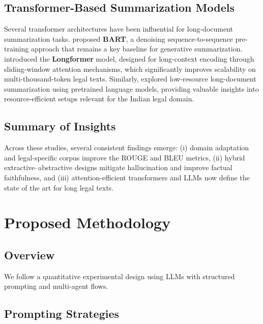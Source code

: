 \documentclass[sigconf]{acmart}
\begin{document}
\subsection{Transformer-Based Summarization Models}
Several transformer architectures have been influential for long-document summarization tasks.  
\citet{lewis2020bart} proposed \textbf{BART}, a denoising sequence-to-sequence pre-training approach that remains a key baseline for generative summarization.  
\citet{beltagy2020longformer} introduced the \textbf{Longformer} model, designed for long-context encoding through sliding-window attention mechanisms, which significantly improves scalability on multi-thousand-token legal texts.  
Similarly, \citet{bajaj2021longdocument} explored low-resource long-document summarization using pretrained language models, providing valuable insights into resource-efficient setups relevant for the Indian legal domain.

\subsection{Summary of Insights}
Across these studies, several consistent findings emerge:
(i) domain adaptation and legal-specific corpus improve the ROUGE and BLEU metrics,  
(ii) hybrid extractive–abstractive designs mitigate hallucination and improve factual faithfulness, and
(iii) attention-efficient transformers and LLMs now define the state of the art for long legal texts.

\section{Proposed Methodology}

\subsection{Overview}
We follow a quantitative experimental design using LLMs with structured prompting and multi-agent flows.

\subsection{Prompting Strategies}
\end{document}
